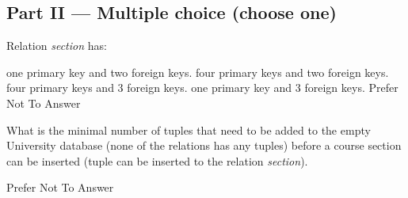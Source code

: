\documentclass[12pt, addpoints, answers]{exam}
\begin{document}
\begin{questions}

\section*{Part II — Multiple choice (choose one)}

\begin{minipage}{\linewidth}
\question[3]
Relation \textit{section} has:\par\vspace{0.5em}
\begin{checkboxes} 
    \CorrectChoice one primary key and two foreign keys.
    \choice four primary keys and two foreign keys.
    \choice four primary keys and 3 foreign keys.
    \choice one primary key and 3 foreign keys.
    \CorrectChoice Prefer Not To Answer
\end{checkboxes}
\end{minipage}\vspace{1em}

\begin{minipage}{\linewidth}
\question[3]
What is the minimal number of tuples that need to be added to the empty University database (none of the relations has any tuples) 
before a course section can be inserted (tuple can be inserted to the relation \textit{section}).\par\vspace{0.5em}
\begin{checkboxes} 
    \CorrectChoice Prefer Not To Answer
\end{checkboxes}
\end{minipage}\vspace{1em}


\end{questions}
\end{document}
